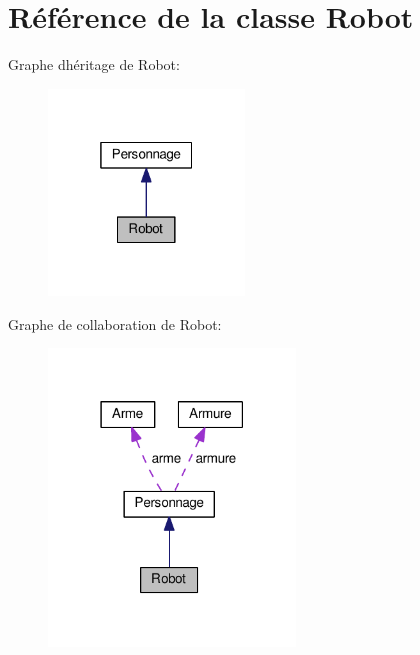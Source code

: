 \hypertarget{classRobot}{}\section{Référence de la classe Robot}
\label{classRobot}


Graphe d\textquotesingle{}héritage de Robot\+:\nopagebreak
\begin{figure}[H]
\begin{center}
\leavevmode
\includegraphics[width=148pt]{classRobot__inherit__graph}
\end{center}
\end{figure}


Graphe de collaboration de Robot\+:
\nopagebreak
\begin{figure}[H]
\begin{center}
\leavevmode
\includegraphics[width=186pt]{classRobot__coll__graph}
\end{center}
\end{figure}
